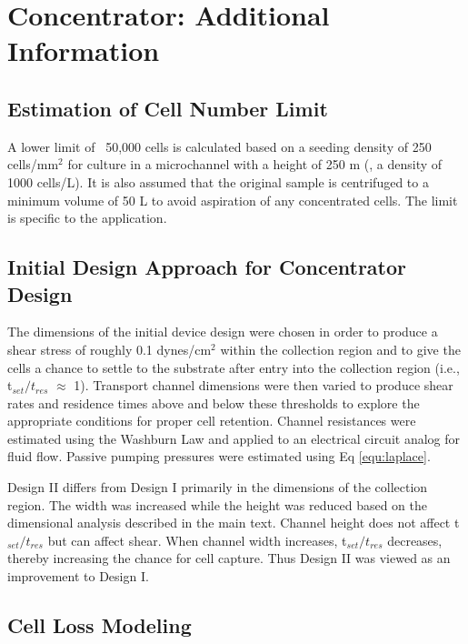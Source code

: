 \chapter{Concentrator: Additional Information}
\label{App:Concentrator}

\section{Estimation of Cell Number Limit}

A lower limit of ~50,000 cells is calculated based on a seeding density of 250 cells/mm$^{2}$ for culture in a microchannel with a height of 250 \textmu m (\ie , a density of 1000 cells/\textmu L). It is also assumed that the original sample is centrifuged to a minimum volume of 50 \textmu L to avoid aspiration of any concentrated cells. The limit is specific to the application.

\section{Initial Design Approach for Concentrator Design}

The dimensions of the initial device design were chosen in order to produce a shear stress of roughly 0.1 dynes/cm$^{2}$ within the collection region and to give the cells a chance to settle to the substrate after entry into the collection region (i.e., t$_{set}/t_{res}$ $\approx$ 1). Transport channel dimensions were then varied to produce shear rates and residence times above and below these thresholds to explore the appropriate conditions for proper cell retention. Channel resistances were estimated using the Washburn Law and applied to an electrical circuit analog for fluid flow. Passive pumping pressures were estimated using Eq \ref{equ:laplace}.

Design II differs from Design I primarily in the dimensions of the collection region. The width was increased while the height was reduced based on the dimensional analysis described in the main text. Channel height does not affect t$_{set}/t_{res}$ but can affect shear. When channel width increases, t$_{set}/t_{res}$ decreases, thereby increasing the chance for cell capture. Thus Design II was viewed as an improvement to Design I.

\section{Cell Loss Modeling}

